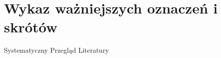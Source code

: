 \chapter*{Wykaz ważniejszych oznaczeń i skrótów}

\begin{description}
	\item [Systematyczny Przegląd Literatury] 
\end{description}
